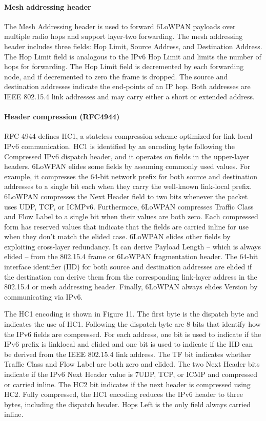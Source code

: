 \paragraph{Mesh addressing header}

The Mesh Addressing header is used to forward 6LoWPAN payloads over multiple radio hops and support layer-two forwarding.
The mesh addressing header includes three fields:
	Hop Limit,
	Source Address,
	and Destination Address.
The Hop Limit field is analogous to the IPv6 Hop Limit and limits the number of hops for forwarding.
The Hop Limit field is decremented by each forwarding node,
	and if decremented to zero the frame is dropped.
The source and destination addresses indicate the end-points of an IP hop.
Both addresses are IEEE 802.15.4 link addresses and may carry either a short or extended address.

\paragraph{Header compression (RFC4944)}

RFC 4944 defines HC1,
	a stateless compression scheme optimized for link-local IPv6 communication.
HC1 is identified by an encoding byte following the Compressed IPv6 dispatch header,
	and it operates on fields in the upper-layer headers. 6LoWPAN elides some fields by assuming commonly used values.
For example,
	it compresses the 64-bit network prefix for both source and destination addresses to a single bit each when they carry the well-known link-local prefix. 6LoWPAN compresses the Next Header field to two bits whenever the packet uses UDP,
	TCP,
	or ICMPv6.
Furthermore, 6LoWPAN compresses Traffic Class and Flow Label to a single bit when their values are both zero.
Each compressed form has reserved values that indicate that the fields are carried inline for use when they don’t match the elided case.
6LoWPAN elides other fields by exploiting cross-layer redundancy.
It can derive Payload Length – which is always elided – from the 802.15.4 frame or 6LoWPAN fragmentation header.
The 64-bit interface identifier (IID) for both source and destination addresses are elided if the destination can derive them from the corresponding link-layer address in the 802.15.4 or mesh addressing header.
Finally, 6LoWPAN always elides Version by communicating via IPv6.

The HC1 encoding is shown in Figure 11.
The first byte is the dispatch byte and indicates the use of HC1.
Following the dispatch byte are 8 bits that identify how the IPv6 fields are compressed.
For each address,
	one bit is used to indicate if the IPv6 prefix is linklocal and elided and one bit is used to indicate if the IID can be derived from the IEEE 802.15.4 link address.
The TF bit indicates whether Traffic Class and Flow Label are both zero and elided.
The two Next Header bits indicate if the IPv6 Next Header value is 7UDP,
	TCP,
	or ICMP and compressed or carried inline.
The HC2 bit indicates if the next header is compressed using HC2.
Fully compressed,
	the HC1 encoding reduces the IPv6 header to three bytes,
	including the dispatch header.
Hops Left is the only field always carried inline.


